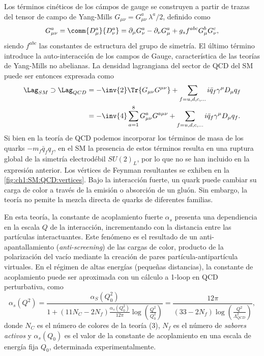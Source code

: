 Los términos cinéticos de los cámpos de gauge se construyen a partir de trazas del tensor de campo de Yang-Mills $G_{\mu\nu} = G_{\mu\nu}^a \ \lambda^a/2$, definido como
\[ G_{\mu\nu}^a = \comm{D_\mu^a}{D_\nu^a} = \partial_\mu G^a_\nu - \partial_\nu G^a_\mu + g_s f^{abc} G^b_\mu G^c_\nu, \]
siendo $f^{abc}$ las constantes de estructura del grupo de simetría. El último término introduce la auto-interacción de los campos de Gauge, característica de las teorías de Yang-Mills no abelianas. La densidad lagrangiana del sector de QCD del SM puede ser entonces expresada como
\begin{align*}
  \Lag_{SM} \supset \Lag_{QCD} &= -\inv{2} \Tr{G_{\mu\nu} G^{\mu\nu}} + \sum_{f = u, d, c, \dots} i \bar{q}_f \gamma^\mu D_\mu q_f \\
             &= -\inv{4} \sum_{a = 1}^8 G_{\mu\nu}^a G^{a\mu\nu} + \sum_{f = u, d, c, \dots} i \bar{q}_f \gamma^\mu D_\mu q_f.
\end{align*}
Si bien en la teoría de QCD podemos incorporar los términos de masa de los quarks $-m_f \bar{q}_f q_f$, en el SM la presencia de estos términos resulta en una ruptura global de la simetría electrodébil $SU(2)_L$, por lo que no se han incluido en la expresión anterior. Los vértices de Feynman resultantes se exhiben en la \cref{fig:ch1:SM:QCD:vertices}. Bajo la interacción fuerte, un quark puede cambiar su carga de color a través de la emisión o absorción de un gluón. Sin embargo, la teoría no pemite la mezcla directa de quarks de diferentes familias.

En esta teoría, la constante de acoplamiento fuerte $\alpha_s$ presenta una dependiencia en la escala $Q$ de la interacción, incrementando con la distancia entre las partículas interactuantes. Este fenómeno es el resultado de un anti-apantallamiento (\textit{anti-screening}) de las cargas de color, producto de la polarización del vacío mediante la creación de pares partícula-antipartícula virtuales. En el régimen de altas energías (pequeñas distancias), la constante de acoplamiento puede ser aproximada con un cálculo a 1-loop en QCD perturbativa, como
\[ \alpha_s(Q^2) = \frac{\alpha_S(Q_0^2)}{1 + (11 N_C - 2 N_f) \frac{\alpha_s(Q_0^2)}{12\pi} \log(\frac{Q^2}{Q_0^2})} = \frac{12\pi}{(33 - 2N_f) \log(\frac{Q^2}{\Lambda^2_{QCD}})}, \]
donde $N_C$ es el número de colores de la teoría (3), $N_f$ es el número de \textit{sabores activos} y $\alpha_s(Q_0)$ es el valor de la constante de acoplamiento en una escala de energía fija $Q_0$, determinada experimentalmente.

